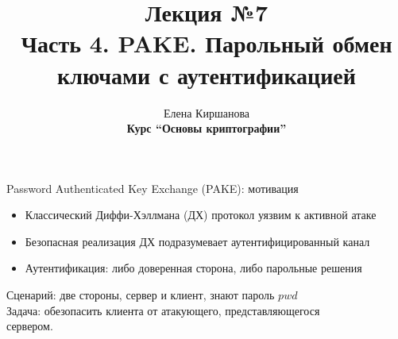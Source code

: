 \documentclass[usenames,dvipsnames,8pt,aspectratio=169]{beamer}
\title{Лекция №7 \\[10pt]
	Часть 4. PAKE. Парольный обмен ключами с аутентификацией}
\date{ Елена Киршанова \\  \textbf{Курс ``Основы криптографии''} \\  }
\begin{document}
	
\begin{frame}
	\titlepage
\end{frame}



\begin{frame}{Password Authenticated Key Exchange (PAKE): мотивация}
	\Large
	\begin{itemize}
		\itemsep 10pt
		\item Классический Диффи-Хэллмана (ДХ) протокол уязвим к активной атаке
		\item Безопасная реализация ДХ подразумевает аутентифицированный канал 
		\item Аутентификация:  либо { \color{Orange}доверенная сторона}, либо  {\color{Orange} парольные решения }
	\end{itemize}

\vspace{20pt}

{\color{Orange} Сценарий}: две стороны, сервер и клиент, знают пароль $pwd$ \\[10pt]
{\color{Orange} Задача}: обезопасить клиента от атакующего, представляющегося \\ сервером. 
\end{frame}
\end{document}
